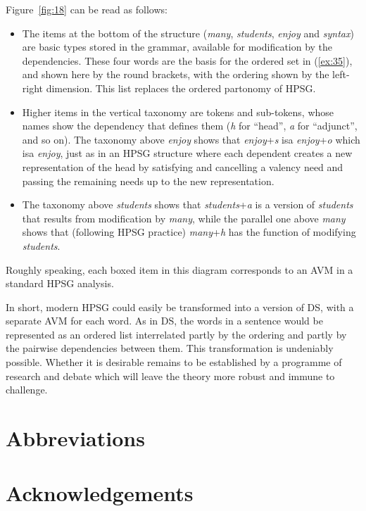 \documentclass[output=paper]{langscibook}
\begin{document}
Figure~\ref{fig:18} can be read as follows:

\begin{itemize}
	\item The items at the bottom of the structure (\emph{many}, \emph{students}, \emph{enjoy} and \emph{syntax}) are basic types stored in the grammar, available for modification by the dependencies. These four words are the basis for the ordered set in (\ref{ex:35}), and shown here by the round brackets, with the ordering shown by the left-right dimension. This list replaces the ordered partonomy of HPSG.

	\item Higher items in the vertical taxonomy are tokens and sub-tokens, whose names show the dependency that defines them (\emph{h} for ``head'', \emph{a} for ``adjunct'', and so on). The taxonomy above \emph{enjoy} shows that \emph{enjoy}+\emph{s} isa \emph{enjoy}+\emph{o} which isa \emph{enjoy}, just as in an HPSG structure where each dependent creates a new representation of the head by satisfying and cancelling a valency need and passing the remaining needs up to the new representation.

	\item The taxonomy above \emph{students} shows that \emph{students}+\emph{a} is a version of \emph{students} that results from modification by \emph{many}, while the parallel one above \emph{many} shows that (following HPSG practice) \emph{many}+\emph{h} has the function of modifying \emph{students}.
\end{itemize}

Roughly speaking, each boxed item in this diagram corresponds to an AVM in a standard HPSG analysis.

In short, modern HPSG could easily be transformed into a version of DS, with a separate AVM for each word. As in DS, the words in a sentence would be represented as an ordered list interrelated partly by the ordering and partly by the pairwise dependencies between them. This transformation is undeniably possible. Whether it is desirable remains to be established by a programme of research and debate which will leave the theory more robust and immune to challenge.


\section*{Abbreviations}
\section*{Acknowledgements}

{\sloppy
\printbibliography[heading=subbibliography,notkeyword=this] 
}
\end{document}
